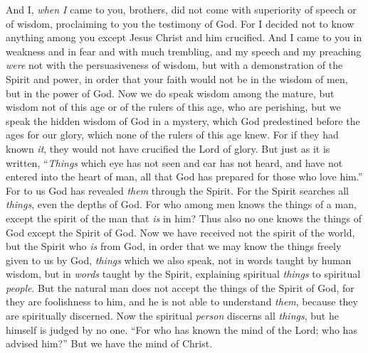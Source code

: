 \begin{biblechapter} %
 And I, \textit{when I} came to you, brothers, did not come with superiority of speech or of wisdom, proclaiming to you the testimony of God.
\verse For I decided not to know anything among you except Jesus Christ and him crucified.
\verse And I came to you in weakness and in fear and with much trembling,
\verse and my speech and my preaching \textit{were} not with the persuasiveness of wisdom, but with a demonstration of the Spirit and power,
\verse in order that your faith would not be in the wisdom of men, but in the power of God.
 Now we do speak wisdom among the mature, but wisdom not of this age or of the rulers of this age, who are perishing,
\verse but we speak the hidden wisdom of God in a mystery, which God predestined before the ages for our glory,
\verse which none of the rulers of this age knew. For if they had known \textit{it}, they would not have crucified the Lord of glory.
\verse But just as it is written, “\textit{Things} which eye has not seen and ear has not heard, 
and have not entered into the heart of man, 
all that God has prepared for those who love him.”
\verse For to us God has revealed \textit{them} through the Spirit. For the Spirit searches all \textit{things}, even the depths of God.
\verse For who among men knows the things of a man, except the spirit of the man that \textit{is} in him? Thus also no one knows the things of God except the Spirit of God.
\verse Now we have received not the spirit of the world, but the Spirit who \textit{is} from God, in order that we may know the things freely given to us by God,
\verse \textit{things} which we also speak, not in words taught by human wisdom, but in \textit{words} taught by the Spirit, explaining spiritual \textit{things} to spiritual \textit{people}.
\verse But the natural man does not accept the things of the Spirit of God, for they are foolishness to him, and he is not able to understand \textit{them}, because they are spiritually discerned.
\verse Now the spiritual \textit{person} discerns all \textit{things}, but he himself is judged by no one.
\verse “For who has known the mind of the Lord; who has advised him?” But we have the mind of Christ.
\end{biblechapter}

